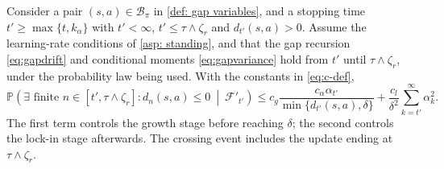 \begin{lemma}
\label{lem:barrier}
Consider a pair $(s,a)\in\mathcal B_\pi$ in \autoref{def: gap variables}, and a stopping time $t'\ge\max\{t,k_\alpha\}$ with $t'<\infty$, $t'\le\tau\wedge\zeta_r$ and $d_{t'}(s,a)>0$.
Assume the learning-rate conditions of \autoref{asp: standing}, and that the gap recursion \eqref{eq:gapdrift} and conditional moments \eqref{eq:gapvariance} hold from $t'$ until $\tau\wedge\zeta_r$, under the probability law being used. With the constants in \eqref{eq:c-def},
\begin{equation}
\label{eq:barrier}
\mathbb P\!\left(\exists\text{ finite }n\in[t',\tau\wedge\zeta_r]:d_n(s,a)\le0\ \middle|\ \mathcal F'_{t'}\right)
\le c_g\frac{c_\alpha\alpha_{t'}}{\min\{d_{t'}(s,a),\delta\}}
+\frac{c_l}{\delta^2}\sum_{k=t'}^\infty\alpha_k^2.
\end{equation}
The first term controls the growth stage before reaching $\delta$; the second controls the lock-in stage afterwards. The crossing event includes the update ending at $\tau\wedge\zeta_r$.
\end{lemma}
